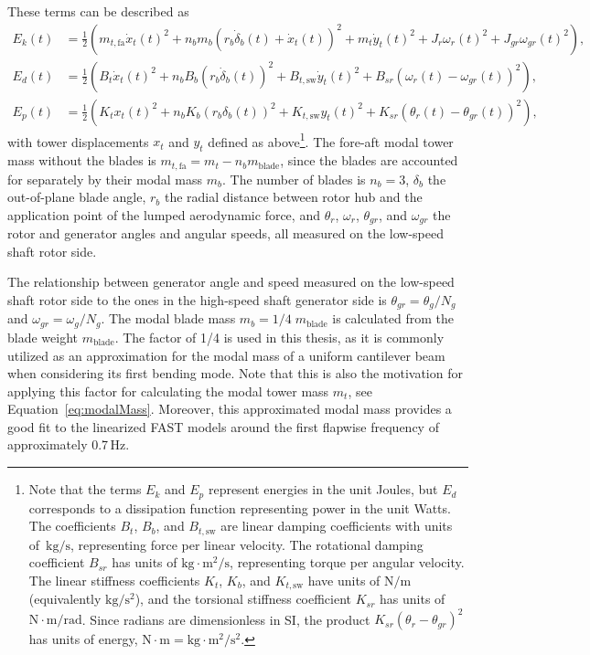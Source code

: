 %
These terms can be described as
\begin{align*}
    E_k(t) & = \frac{1}{2}\left(m_{t,\text{fa}}\dot{x}_t(t)^2 + n_b m_b(r_b\dot{\delta}_b(t) + \dot{x}_t(t))^2 + m_t\dot{y}_t(t)^2 + J_r\omega_r(t)^2 + J_{gr}\omega_{gr}(t)^2\right),\\
    E_d(t)  & = \frac{1}{2}\left(B_t\dot{x}_t(t)^2 + n_b B_b(r_b\dot{\delta}_b(t))^2 + B_{t,\text{sw}}\dot{y}_t(t)^2 + B_{sr}(\omega_r(t) - \omega_{gr}(t))^2\right),\\
    E_p(t)  & = \frac{1}{2}\left(K_t{x}_t(t)^2 + n_b K_b(r_b{\delta}_b(t))^2 + K_{t,\text{sw}}{y}_t(t)^2 + K_{sr}(\theta_r(t) - \theta_{gr}(t))^2\right),
\end{align*}
with tower displacements \(x_t\) and \(y_t\) defined as above\footnote{Note that the terms \(E_k\) and \(E_p\) represent energies in the unit Joules, but \(E_d\) corresponds to a dissipation function representing power in the unit Watts. The coefficients \(B_t\), \(B_b\), and \(B_{t,\text{sw}}\) are linear damping coefficients with units of~\(\text{kg}/\text{s}\), representing force per linear velocity. The rotational damping coefficient \(B_{sr}\) has units of \(\text{kg}\cdot \text{m}^2/\text{s}\), representing torque per angular velocity. The linear stiffness coefficients \(K_t\), \(K_b\), and \(K_{t,\text{sw}}\) have units of \(\text{N}/\text{m}\) (equivalently \(\text{kg}/\text{s}^2\)), and the torsional stiffness coefficient \(K_{sr}\) has units of \(\text{N}\cdot\text{m}/\text{rad}\). Since radians are dimensionless in SI, the product \(K_{sr}(\theta_r - \theta_{gr})^2\) has units of energy, \( \text{N}\cdot\text{m} =\text{kg} \cdot \text{m}^2 / \text{s}^2\).}. The fore-aft modal tower mass without the blades is $m_{t,\text{fa}} = m_t - n_b m_{\text{blade}}$, since the blades are accounted for separately by their modal mass $m_b$. The number of blades is $n_b=3$, \(\delta_b\) the out-of-plane blade angle, $r_b$ the radial distance between rotor hub and the application point of the lumped aerodynamic force, and \(\theta_r\), \(\omega_r\), \(\theta_{gr}\), and \(\omega_{gr}\) the rotor and generator angles and angular speeds, all measured on the low-speed shaft rotor side.

The relationship between generator angle and speed measured on the low-speed shaft rotor side to the ones in the high-speed shaft generator side is $\theta_{gr} = \theta_{g}/N_g$ and  $\omega_{gr} = \omega_{g}/N_g$. The modal blade mass $m_b = 1/4\; m_{\text{blade}}$ is calculated from the blade weight $m_{\text{blade}}$. The factor of 1/4 is used in this thesis, as it is commonly utilized as an approximation for the modal mass of a uniform cantilever beam when considering its first bending mode. Note that this is also the motivation for applying this factor for calculating the modal tower mass $m_t$, see Equation~\eqref{eq:modalMass}. Moreover, this approximated modal mass provides a good fit to the linearized FAST models around the first flapwise frequency of approximately 0.7\,Hz. 

